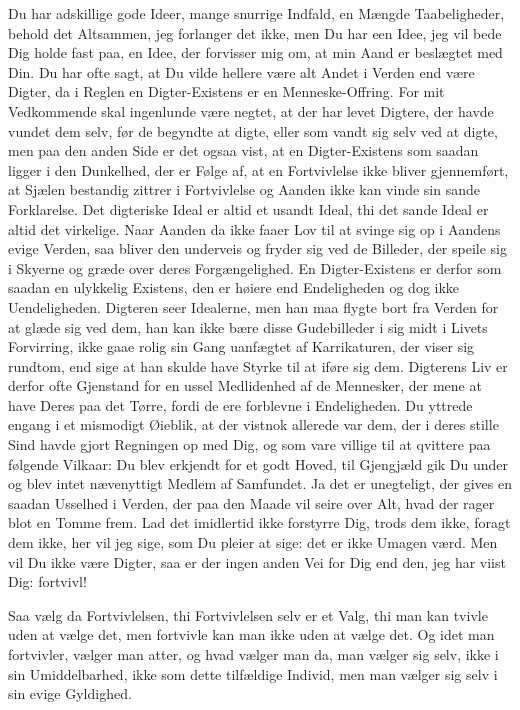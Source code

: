 \documentclass[12pt,a4paper]{article}
\begin{document}
Du har adskillige gode Ideer, mange snurrige Indfald, en Mængde Taabeligheder, behold det Altsammen, jeg forlanger det ikke, men Du har een Idee, jeg vil bede Dig holde fast paa, en Idee, der forvisser mig om, at min Aand er beslægtet med Din. Du har ofte sagt, at Du vilde hellere være alt Andet i Verden end være Digter, da i Reglen en Digter-Existens er en Menneske-Offring. For mit Vedkommende skal ingenlunde være negtet, at der har levet Digtere, der havde vundet dem selv, før de begyndte at digte, eller som vandt sig selv ved at digte, men paa den anden Side er det ogsaa vist, at en Digter-Existens som saadan ligger i den Dunkelhed, der er Følge af, at en Fortvivlelse ikke bliver gjennemført, at Sjælen bestandig zittrer i Fortvivlelse og Aanden ikke kan vinde sin sande Forklarelse. Det digteriske Ideal er altid et usandt Ideal, thi det sande Ideal er altid det virkelige. Naar Aanden da ikke faaer Lov til at svinge sig op i Aandens evige Verden, saa bliver den underveis og fryder sig ved de Billeder, der speile sig i Skyerne og græde over deres Forgængelighed. En Digter-Existens er derfor som saadan en ulykkelig Existens, den er høiere end Endeligheden og dog ikke Uendeligheden. Digteren seer Idealerne, men han maa flygte bort fra Verden for at glæde sig ved dem, han kan ikke bære disse Gudebilleder i sig midt i Livets Forvirring, ikke gaae rolig sin Gang uanfægtet af Karrikaturen, der viser sig rundtom, end sige at han skulde have Styrke til at iføre sig dem. Digterens Liv er derfor ofte Gjenstand for en ussel Medlidenhed af de Mennesker, der mene at have Deres paa det Tørre, fordi de ere forblevne i Endeligheden. Du yttrede engang i et mismodigt Øieblik, at der vistnok allerede var dem, der i deres stille Sind havde gjort Regningen op med Dig, og som vare villige til at qvittere paa følgende Vilkaar: Du blev erkjendt for et godt Hoved, til Gjengjæld gik Du under og blev intet nævenyttigt Medlem af Samfundet. Ja det er unegteligt, der gives en saadan Usselhed i Verden, der paa den Maade vil seire over Alt, hvad der rager blot en Tomme frem. Lad det imidlertid ikke forstyrre Dig, trods dem ikke, foragt dem ikke, her vil jeg sige, som Du pleier at sige: det er ikke Umagen værd. Men vil Du ikke være Digter, saa er der ingen anden Vei for Dig end den, jeg har viist Dig: fortvivl!

Saa vælg da Fortvivlelsen, thi Fortvivlelsen selv er et Valg, thi man kan tvivle uden at vælge det, men fortvivle kan man ikke uden at vælge det. Og idet man fortvivler, vælger man atter, og hvad vælger man da, man vælger sig selv, ikke i sin Umiddelbarhed, ikke som dette tilfældige Individ, men man vælger sig selv i sin evige Gyldighed.
\end{document}
